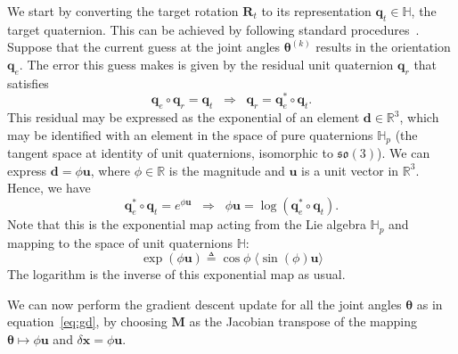 We start by converting the target rotation $\bm{R}_t$ to its representation
$\bm{q}_t \in \mathbb{H}$, the target quaternion. This can be achieved by
following standard procedures~\cite{quaternion}. Suppose that the current guess
at the joint angles $\bm{\theta}^{(k)}$ results in the orientation $\bm{q}_e$.
The error this guess makes is given by the residual unit quaternion $\bm{q}_r$
that satisfies
%
\[
\bm{q}_e \circ \bm{q}_r = \bm{q}_t \;\; \Rightarrow \;\; \bm{q}_r = \bm{q}_e^* \circ \bm{q}_t.
\]
%
This residual may be expressed as the exponential of an element $\bm{d} \in
\mathbb{R}^3$, which may be identified with an element in the space of pure
quaternions $\mathbb{H}_p$ (the tangent space at identity of unit quaternions,
isomorphic to $\mathfrak{so}(3)$). We can express $\bm{d} = \phi \bm{u}$, where
$\phi \in \mathbb{R}$ is the magnitude and $\bm{u}$ is a unit vector in
$\mathbb{R}^3$. Hence, we have 
\[\bm{q}_e^* \circ \bm{q}_t = e^{\phi \bm{u}} \;\; \Rightarrow \;\; \phi \bm{u} =
\log{\left(\bm{q}_e^* \circ \bm{q}_t\right)}. \]
%
Note that this is the exponential map acting from the Lie algebra $\mathbb{H}_p$
and mapping to the space of unit quaternions $\mathbb{H}$:
\[
\exp\left(\phi \bm{u} \right) \triangleq \cos{\phi}\; \langle \sin{(\phi)} \bm{u} \rangle
\]
%
The logarithm is the inverse of this exponential map as usual.

We can now perform the gradient descent update for all the joint angles
$\bm{\theta}$ as in equation~\eqref{eq:gd}, by choosing $\bm{M}$ as the Jacobian
transpose of the mapping $\bm{\theta} \mapsto \phi \bm{u}$ and $\delta \bm{x} = 
\phi \bm{u}$.